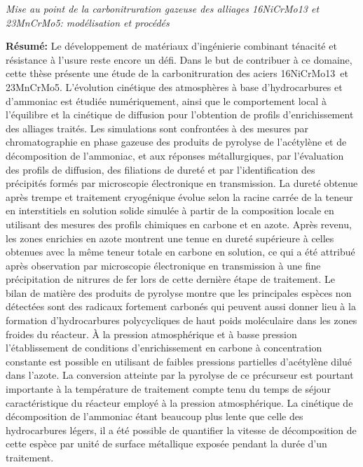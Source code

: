 \clearpage
{}
\thispagestyle{empty}
{\small
\noindent\emph{Mise au point de la carbonitruration gazeuse des alliages
16NiCrMo13 et 23MnCrMo5: modélisation et procédés}\par\vskip0.4cm

\noindent\textbf{Résumé:} Le développement de matériaux d'ingénierie combinant
ténacité et résistance à l'usure reste encore un défi. Dans le but de contribuer
à ce domaine, cette thèse présente une étude de la carbonitruration des aciers
16NiCrMo13 et 23MnCrMo5. L'évolution cinétique des atmosphères à base
d'hydrocarbures et d'ammoniac est étudiée numériquement, ainsi que le
comportement local à l'équilibre et la cinétique de diffusion pour l'obtention
de profils d'enrichissement des alliages traités. Les simulations sont
confrontées à des mesures par chromatographie en phase gazeuse des produits de
pyrolyse de l'acétylène et de décomposition de l'ammoniac, et aux réponses
métallurgiques, par l'évaluation des profils de diffusion, des filiations de
dureté et par l'identification des précipités formés par microscopie
électronique en transmission. La dureté obtenue après trempe et traitement
cryogénique évolue selon la racine carrée de la teneur en interstitiels en
solution solide simulée à partir de la composition locale en utilisant des
mesures des profils chimiques en carbone et en azote. Après revenu, les zones
enrichies en azote montrent une tenue en dureté supérieure à celles obtenues
avec la même teneur totale en carbone en solution, ce qui a été attribué après
observation par microscopie électronique en transmission à une fine
précipitation de nitrures de fer lors de cette dernière étape de traitement. Le
bilan de matière des produits de pyrolyse montre que les principales espèces non
détectées sont des radicaux fortement carbonés qui peuvent aussi donner lieu à
la formation d'hydrocarbures polycycliques de haut poids moléculaire dans les
zones froides du réacteur. À la pression atmosphérique et à basse pression
l'établissement de conditions d'enrichissement en carbone à concentration
constante est possible en utilisant de faibles pressions partielles d'acétylène
dilué dans l'azote. La conversion atteinte par la pyrolyse de ce précurseur est
pourtant importante à la température de traitement compte tenu du temps de
séjour caractéristique du réacteur employé à la pression atmosphérique. La
cinétique de décomposition de l'ammoniac étant beaucoup plus lente que celle des
hydrocarbures légers, il a été possible de quantifier la vitesse de
décomposition de cette espèce par unité de surface métallique exposée pendant la
durée d'un traitement.

}
